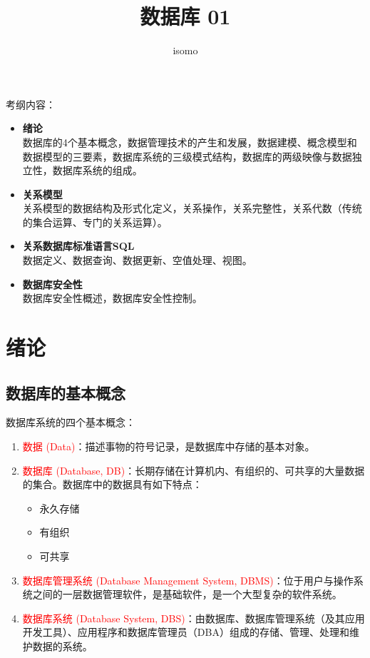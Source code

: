 \documentclass{../../note}
\title{数据库 01}
\author{isomo}
\begin{document}
\maketitle

考纲内容：

\begin{itemize}

  \item \textbf{绪论}\\
    数据库的4个基本概念，数据管理技术的产生和发展，数据建模、概念模型和数据模型的三要素，数据库系统的三级模式结构，数据库的两级映像与数据独立性，数据库系统的组成。

  \item \textbf{关系模型}\\
    关系模型的数据结构及形式化定义，关系操作，关系完整性，关系代数（传统的集合运算、专门的关系运算）。

  \item \textbf{关系数据库标准语言SQL}\\
    数据定义、数据查询、数据更新、空值处理、视图。

  \item \textbf{数据库安全性}\\
    数据库安全性概述，数据库安全性控制。

\end{itemize}

\section{绪论}

\subsection{数据库的基本概念}

数据库系统的四个基本概念：

\begin{enumerate}
  \item \textcolor{red}{数据 (Data)}：描述事物的符号记录，是数据库中存储的基本对象。

  \item \textcolor{red}{数据库 (Database, DB)}：长期存储在计算机内、有组织的、可共享的大量数据的集合。数据库中的数据具有如下特点：
    \begin{itemize}
      \item 永久存储
      \item 有组织
      \item 可共享
    \end{itemize}

  \item \textcolor{red}{数据库管理系统 (Database Management System, DBMS)}：位于用户与操作系统之间的一层数据管理软件，是基础软件，是一个大型复杂的软件系统。

  \item \textcolor{red}{数据库系统 (Database System, DBS)}：由数据库、数据库管理系统（及其应用开发工具）、应用程序和数据库管理员（DBA）组成的存储、管理、处理和维护数据的系统。
\end{enumerate}
\end{document}

